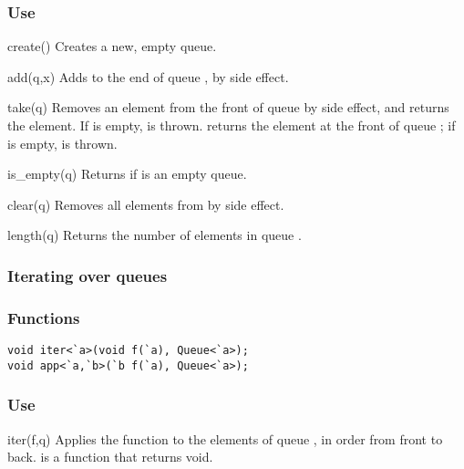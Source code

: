 \subsubsection*{Use}

\begin{defun}{create}{()}
Creates a new, empty queue.
\end{defun}

\begin{defun}{add}{(q,x)}
Adds  to the end of queue , by side effect.
\end{defun}

\begin{defun}{take}{(q)}
Removes an element from the front of queue  by side effect, and
returns the element.  If  is empty,  is thrown.
 returns the element at the front of queue ;
if  is empty,  is thrown.
\end{defun}

\begin{defun}{is_empty}{(q)}
Returns  if  is an empty queue.
\end{defun}

\begin{defun}{clear}{(q)}
Removes all elements from  by side effect.
\end{defun}

\begin{defun}{length}{(q)}
Returns the number of elements in queue .
\end{defun}

\subsubsection*{Iterating over queues}
\subsubsection*{Functions}
\begin{verbatim}
void iter<`a>(void f(`a), Queue<`a>);
void app<`a,`b>(`b f(`a), Queue<`a>);
\end{verbatim}

\subsubsection*{Use}

\begin{defun}{iter}{(f,q)}
Applies the function  to the elements of queue , in order
from front to back.   is a function that returns void.
\end{defun}

